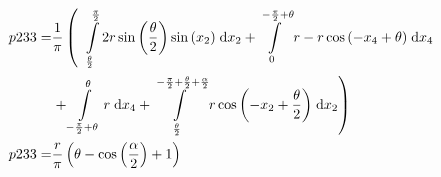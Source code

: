 \begin{align}
    p233 =&\frac{1}{\pi} \left(\;\;\int\limits_{\frac{\theta}{2}}^{\frac{\pi}{2}}2 r \sin{\left (\frac{\theta}{2} \right )} \sin{\left (x_{2} \right )}\;\mathrm{d}x_{2}+\int\limits_{0}^{- \frac{\pi}{2} + \theta}r - r \cos{\left (- x_{4} + \theta \right )}\;\mathrm{d}x_{4}\right.\notag\\
 &\left.+\int\limits_{- \frac{\pi}{2} + \theta}^{\theta}r\;\mathrm{d}x_{4}+\int\limits_{\frac{\theta}{2}}^{- \frac{\pi}{2} + \frac{\theta}{2} + \frac{\alpha}{2}}r \cos{\left (- x_{2} + \frac{\theta}{2} \right )}\;\mathrm{d}x_{2}\right)\label{p233Def}\\
    p233 =& \frac{r}{\pi} \left(\theta - \cos{\left (\frac{\alpha}{2} \right )} + 1\right)\label{p233Sln}
\end{align}